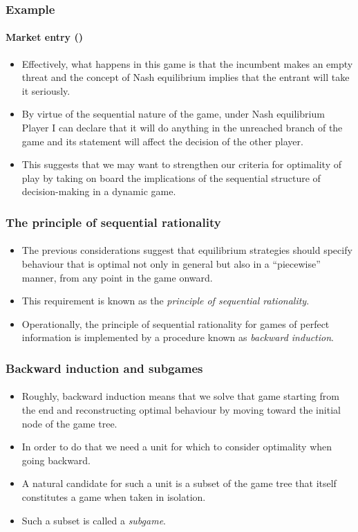 \documentclass[10pt]{beamer}
\theoremstyle{definition}
\begin{document}
\begin{frame}[fragile]
\frametitle{Example }
\framesubtitle{Market entry ()}
\begin{itemize}\itemsep1em
\item Effectively, what happens in this game is that the incumbent makes an empty threat and the concept of Nash equilibrium implies that the entrant will take it seriously.
\item By virtue of the sequential nature of the game, under Nash equilibrium Player I can declare that it will do anything in the unreached branch of the game and its statement will affect the decision of the other player.
\item This suggests that we may want to strengthen our criteria for optimality of play by taking on board the implications of the sequential structure of decision-making in a dynamic game.
\end{itemize}
\end{frame}



\begin{frame}[fragile]
\frametitle{The principle of sequential rationality}
\framesubtitle{}
\begin{itemize}\itemsep1em
\item The previous considerations suggest that equilibrium strategies should specify behaviour that is optimal not only in general but also in a ``piecewise'' manner, from any point in the game onward.
\item This requirement is known as the \emph{principle of sequential rationality}.
\item Operationally, the principle of sequential rationality for games of perfect information is implemented by a procedure known as \emph{backward induction}.
\end{itemize}
\end{frame}



\begin{frame}[fragile]
\frametitle{Backward induction and subgames}
\framesubtitle{}
\begin{itemize}\itemsep1em
\item Roughly, backward induction means that we solve that game starting from the end and reconstructing optimal behaviour by moving toward the initial node of the game tree.
\item In order to do that we need a unit for which to consider optimality when going backward.
\item A natural candidate for such a unit is a subset of the game tree that itself constitutes a game when taken in isolation.
\item Such a subset is called a \emph{subgame}.
\end{itemize}
\end{frame}
\end{document}
